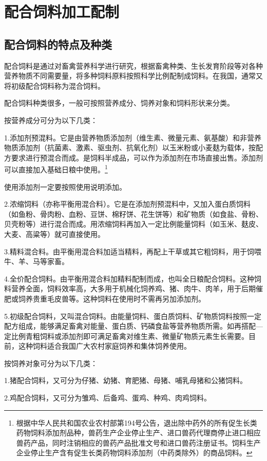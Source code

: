 \documentclass{ctexbook}
\begin{document}
\chapter{配合饲料加工配制}
\section{配合饲料的特点及种类}
配合饲料是通过对畜禽营养科学进行研究，根据畜禽种类、生长发育阶段等对各种营养物质不同需要量，将多种饲料原料按照科学比例配制成饲料。在我国，通常又将初级配合饲料称为混合饲料。

配合饲料种类很多，一般可按照营养成分、饲养对象和饲料形状来分类。

按营养成分可分为以下几类：

1.添加剂预混料。它是由营养物质添加剂（维生素、微量元素、氨基酸）和非营养物质添加剂（抗菌素、激素、驱虫剂、抗氧化剂）以玉米粉或小麦麸为载体，按配方要求进行预混合而成。是饲料半成品，可以作为添加剂在市场直接出售。添加剂可以直接加入基础日粮中使用。\footnote{根据中华人民共和国农业农村部第194号公告，退出除中药外的所有促生长类药物饲料添加剂品种，兽药生产企业停止生产、进口兽药代理商停止进口相应兽药产品，同时注销相应的兽药产品批准文号和进口兽药注册证书。饲料生产企业停止生产含有促生长类药物饲料添加剂（中药类除外）的商品饲料。}

使用添加剂一定要按照使用说明添加。

2.浓缩饲料（亦称平衡用混合料）。它是在添加剂预混料中，又加入蛋白质饲料（如鱼粉、骨肉粉、血粉、豆饼、棉籽饼、花生饼等）和矿物质（如食盐、骨粉、贝壳粉等）进行混合而成。用浓缩饲料再加入一定比例能量饲料（如玉米、麸皮、大麦、高粱等）就可直接使用。

3.精料混合料。由平衡用混合料加适当精料，再配上干草或其它粗饲料，用于饲喂牛、羊、马等家畜。

4.全价配合饲料。由平衡用混合料加精料配制而成，也叫全日粮配合饲料。这种饲料营养全面，饲料效率高，大多用于机械化饲养鸡、猪、肉牛、肉羊，用于后期催肥或饲养贵重毛皮兽等。这种饲料在使用时不需再另加添加剂。

5.初级配合饲料，又叫混合饲料。由能量饲料、蛋白质饲料、矿物质饲料按照一定配方组成，能够满足畜禽对能量、蛋白质、钙磷食盐等营养物质所需。如再搭配—定比例青粗饲料或添加剂即可满足畜禽对维生素、微量矿物质元素生长需要。目前，这种饲料适合我国广大农村家庭饲养和集体饲养使用。

按饲养对象可分为以下几类：

1.猪配合饲料，又可分为仔猪、幼猪、育肥猪、母猪、哺乳母猪和公猪饲料。

2.鸡配合饲料，又可分为雏鸡、后备鸡、蛋鸡、种鸡、肉鸡饲料。
\end{document}
